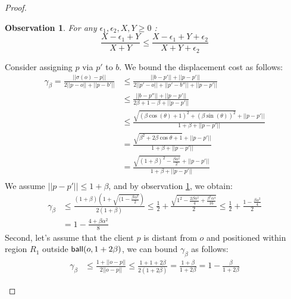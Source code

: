 \documentclass[11pt]{article}
\newtheorem{observation}{Observation}[section]
\newcommand{\ball}{{\sf ball}}
\begin{document}
\begin{proof}
\begin{itemize}
    \begin{observation} \label{obs:case2}
    For any $\epsilon_1 ,\epsilon_2 , X, Y \geq 0$ :  \[\frac{X-\epsilon_1+Y}{X+Y}\leq \frac{X-\epsilon_1 + Y+\epsilon_2}{X+Y+\epsilon_2}\]
    \end{observation}
Consider assigning $p$ via $p'$ to $b$. We bound the displacement cost as follows:
    \begin{equation*}
     \begin{split}
        \gamma_{\beta}= \frac{||\sigma(o)-p||}{2||p-o|| + ||p-b'||} & \leq \frac{||b-p'||+||p-p'||}{2||p'-o|| + ||p'-b''||+||p-p'||}\\
        &\leq \frac{||b-p''||+||p-p'||}{2\beta +1 -\beta+||p-p'||}\\
        & \leq \frac{\sqrt{(\beta \cos(\theta) + 1)^2+(\beta \sin(\theta))^2}+||p-p'||}{1 + \beta+||p-p'||}\\
        &=  \frac{\sqrt{\beta^2 + 2\beta \cos{\theta} +1}+||p-p'||}{1 + \beta+||p-p'||}\\
        &=  \frac{\sqrt{(1+\beta)^2 - \frac{\beta \alpha^2}{2}}+||p-p'||}{1 + \beta+||p-p'||}\\
     \end{split}
    \end{equation*}
    We assume $||p-p'||\leq 1+\beta$, and by observation \ref{obs:case2}, we obtain:
    \begin{equation*}
     \begin{split}
       \gamma_{\beta} &\leq \frac{ (1+\beta) (1+\sqrt{(1-\frac{\beta \alpha^2}{2}})}{2(1+\beta)} \leq \frac{1}{2} + \frac{\sqrt{1^2 - \frac{2\beta \alpha^2}{4} + \frac{\beta^2 \alpha^4}{16}}}{2}\leq\frac{1}{2}+ \frac{1- \frac{\beta \alpha^2}{4}}{2}\\
        &= 1 - \frac{4+\beta \alpha^2}{8}
     \end{split}
    \end{equation*}
Second, let's assume that the client $p$ is distant from $o$ and positioned within region $R_1$ outside  $\ball(o,1+2\beta)$, we can bound $\gamma_{\beta}$ as follows:
    \begin{equation*}
     \begin{split}
       \gamma_{\beta} &\leq  \frac{1 + ||o-p||}{2||o-p||}\leq \frac{1+1+2\beta}{2(1+2\beta)} = \frac{1+\beta}{1+2\beta} = 1 -\frac{\beta}{1+2\beta} 
     \end{split}
    \end{equation*}


\end{itemize}
\end{proof}
\end{document}

